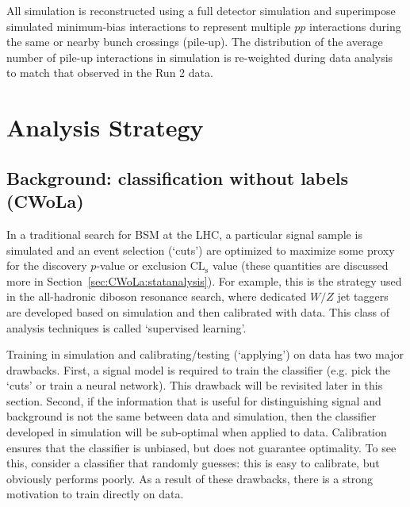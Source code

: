 All simulation is reconstructed using a full detector simulation and superimpose simulated minimum-bias interactions to represent multiple $pp$ interactions during the same or nearby bunch crossings (pile-up).
The distribution of the average number of pile-up interactions in simulation is re-weighted during data analysis to match that observed in the Run 2 data.


\section{Analysis Strategy}
\label{sec:CWoLa:analysis}

\subsection{Background: classification without labels (CWoLa)}
\label{sec:CWoLa:schematic}

In a traditional search for BSM at the LHC, a particular signal sample is simulated and an event selection (`cuts') are optimized to maximize some proxy for the discovery $p$-value or exclusion $\text{CL}_\text{s}$ value (these quantities are discussed more in Section~\ref{sec:CWoLa:statanalysis}).  For example, this is the strategy used in the all-hadronic diboson resonance search, where dedicated $W/Z$ jet taggers are developed based on simulation and then calibrated with data.  This class of analysis techniques is called `supervised learning'.  

Training in simulation and calibrating/testing (`applying') on data has two major drawbacks.  First, a signal model is required to train the classifier (e.g. pick the `cuts' or train a neural network).  This drawback will be revisited later in this section.  Second, if the information that is useful for distinguishing signal and background is not the same between data and simulation, then the classifier developed in simulation will be sub-optimal when applied to data.  Calibration ensures that the classifier is unbiased, but does not guarantee optimality.  To see this, consider a classifier that randomly guesses: this is easy to calibrate, but obviously performs poorly.  As a result of these drawbacks, there is a strong motivation to train directly on data.

